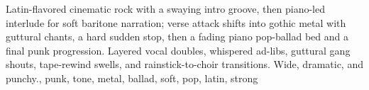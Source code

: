 

\begin{notes}
\end{notes}

\begin{prompt}
Latin-flavored cinematic rock with a swaying intro groove, then piano-led interlude for soft baritone narration; verse attack shifts into gothic metal with guttural chants, a hard sudden stop, then a fading piano pop-ballad bed and a final punk progression. %
Layered vocal doubles, whispered ad-libs, guttural gang shouts, tape-rewind swells, and rainstick-to-choir transitions. %
Wide, dramatic, and punchy., punk, tone, metal, ballad, soft, pop, latin, strong
\end{prompt}

\sepbar


